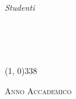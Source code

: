 \begin{titlepage}
\begin{center}
\begin{large}
\vspace{0pt} 

\begin{flushright}
\textit{Studenti}\\
\begin{small}
\vspace{5pt} 
\myNamedue \\
\vspace{0pt} 
\myNametre\\
\vspace{0pt} 
\myName \\
\end{small}
\end{flushright}
\end{large}

\vspace{30pt}

\line(1, 0){338} \\
\begin{normalsize}
\textsc{Anno Accademico \myAA}
\end{normalsize}

\end{center}
\end{titlepage} 